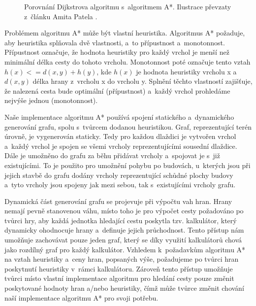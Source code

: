 \begin{figure}[h]
	\centering
	\hfill
	\caption{Porovnání Dijkstrova algoritmu s~algoritmem A*. Ilustrace převzaty z~článku Amita Patela \citep{site:introastar}.}
	\label{fig:astardijkstra}
\end{figure}

Problémem algoritmu A* může být vlastní heuristika. Algoritmus A* požaduje, aby heuristika splňovala dvě vlastnosti, a~to přípustnost a~monotonnost. Přípustnost označuje, že hodnota heuristiky pro každý vrchol je menší než minimální délka cesty do tohoto vrcholu. Monotonnost poté označuje tento vztah \(h(x) <= d(x,y) + h(y)\), kde \(h(x)\) je hodnota heuristiky vrcholu x a \(d(x,y)\) délka hrany z~vrcholu x do vrcholu y. Splnění těchto vlastností zajišťuje, že nalezená cesta bude optimální (přípustnost) a~každý vrchol prohledáme nejvýše jednou (monotonnost). 

Naše implementace algoritmu A* používá spojení statického a~dynamického generování grafu, spolu s~tvůrcem dodanou heuristikou. Graf, reprezentující terén úrovně, je vygenerován staticky. Tedy pro každou dlaždici je vytvořen vrchol a~každý vrchol je spojen se všemi vrcholy reprezentujícími sousední dlaždice. Dále je umožněno do grafu za běhu přidávat vrcholy a~spojovat je s~již existujícími. To je použito pro umožnění pohybu po budovách, u~kterých jsou při jejich stavbě do grafu dodány vrcholy reprezentující schůdné plochy budovy a~tyto vrcholy jsou spojeny jak mezi sebou, tak s~existujícími vrcholy grafu. 

Dynamická část generování grafu se projevuje při výpočtu vah hran. Hrany nemají pevně stanovenou váhu, místo toho je pro výpočet cesty požadováno po tvůrci hry, aby každá jednotka hledající cestu poskytla tzv. kalkulátor, který dynamicky ohodnocuje hrany a~definuje jejich průchodnost. Tento přístup nám umožňuje zachovávat pouze jeden graf, který se díky využití kalkulátorů chová jako rozdílný graf pro každý kalkulátor. 
Vzhledem k~požadavkům algoritmu A* na vztah heuristiky a~ceny hran, popsaných výše, požadujeme po tvůrci hran poskytnutí heuristiky v~rámci kalkulátoru. Zároveň tento přístup umožňuje tvůrci místo vlastní implementace algoritmu pro hledání cesty pouze změnit poskytované hodnoty hran a/nebo heuristiky, čímž může tvůrce změnit chování naší implementace algoritmu A* pro svoji potřebu.


